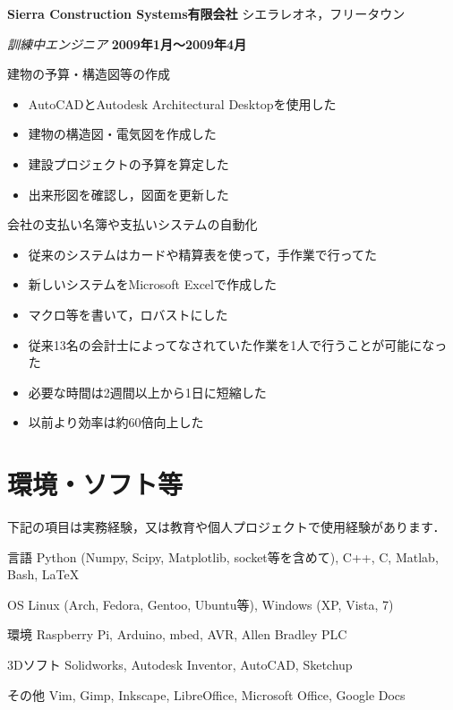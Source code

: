 \documentclass[10pt, a4paper]{article}
\def\xeCJKembold{0.15}
\def\saveCJKnode{\dimen255\lastkern}
\def\restoreCJKnode{\kern-\dimen255\kern\dimen255}
\let\CJKoldsymbol\CJKsymbol
\let\CJKoldpunctsymbol\CJKpunctsymbol
\def\CJKfakeboldsymbol#1{%
\special{pdf:literal direct 2 Tr \xeCJKembold\space w}%
\CJKoldsymbol{#1}%
\saveCJKnode
\special{pdf:literal direct 0 Tr}%
\restoreCJKnode}
\def\CJKfakeboldpunctsymbol#1{%
\special{pdf:literal direct 2 Tr \xeCJKembold\space w}%
\CJKoldpunctsymbol{#1}%
\saveCJKnode
\special{pdf:literal direct 0 Tr}%
\restoreCJKnode}
\newcommand\CJKfakebold[1]{%
\let\CJKsymbol\CJKfakeboldsymbol
\let\CJKpunctsymbol\CJKfakeboldpunctsymbol
#1%
\let\CJKsymbol\CJKoldsymbol
\let\CJKpunctsymbol\CJKoldpunctsymbol}
\begin{document}
\halfblankline

\CJKfakebold{\textbf{Sierra Construction Systems有限会社}}\hfill シエラレオネ，フリータウン

\begin{outerlist}
\item[] \textit{訓練中エンジニア} \hfill \textbf{2009年1月〜2009年4月}
  \begin{innerlist}
  \item 建物の予算・構造図等の作成
    \begin{itemize}
      \item AutoCADとAutodesk Architectural Desktopを使用した
      \item 建物の構造図・電気図を作成した
      \item 建設プロジェクトの予算を算定した
      \item 出来形図を確認し，図面を更新した
    \end{itemize}
  \item 会社の支払い名簿や支払いシステムの自動化
    \begin{itemize}
      \item 従来のシステムはカードや精算表を使って，手作業で行ってた
      \item 新しいシステムをMicrosoft Excelで作成した
      \item マクロ等を書いて，ロバストにした
      \item 従来13名の会計士によってなされていた作業を1人で行うことが可能になった
      \item 必要な時間は2週間以上から1日に短縮した
      \item 以前より効率は約60倍向上した
    \end{itemize}
  \end{innerlist}
\end{outerlist}

\section{環境・ソフト等}
下記の項目は実務経験，又は教育や個人プロジェクトで使用経験があります．
\begin{outerlist}
\item[言語] Python (Numpy, Scipy, Matplotlib, socket等を含めて), C++, C, Matlab, Bash, \LaTeX
\item[OS] Linux (Arch, Fedora, Gentoo, Ubuntu等), Windows (XP, Vista, 7)
\item[環境] Raspberry Pi, Arduino, mbed, AVR, Allen Bradley PLC
\item[3Dソフト] Solidworks, Autodesk Inventor, AutoCAD, Sketchup
\item[その他] Vim, Gimp, Inkscape, LibreOffice, Microsoft Office, Google Docs
\end{outerlist}
\end{document}
